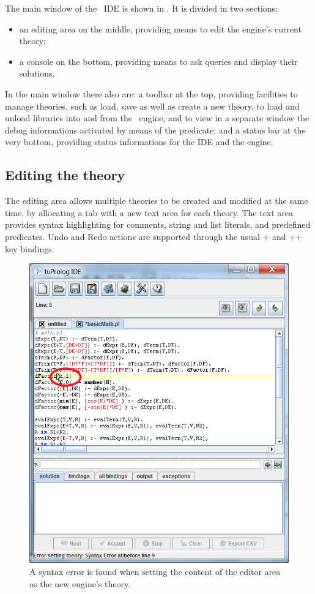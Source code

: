 The main window of the \tuprolog\ IDE is shown in .
%
It is divided in two sections:
%
\begin{itemize}
\item an editing area on the middle, providing means to edit the engine's current theory;
\item a console on the bottom, providing means to ask queries and display their solutions.
\end{itemize}
%
In the main window there also are:
%
a toolbar at the top, providing facilities to manage theories, such as load, save as well as create a new theory, to load and unload libraries into and from the \tuprolog\ engine, and to view in a separate window the debug informations activated by means of the  predicate;
%
and a status bar at the very bottom, providing status informations for the IDE and the engine.

\subsection{Editing the theory}

The editing area allows multiple theories to be created and modified at the same time, by allocating a tab with a new text area for each theory.
%
The text area provides syntax highlighting for comments, string and list literals, and predefined predicates.
%
Undo and Redo actions are supported through the usual + and ++ key bindings.

\begin{figure}
\centering
\includegraphics[scale=0.60]{images/syntaxErrorFound}
\caption{A syntax error is found when setting the content of the editor area as the new engine's theory.}
\label{syntax-error-found}
\end{figure}


